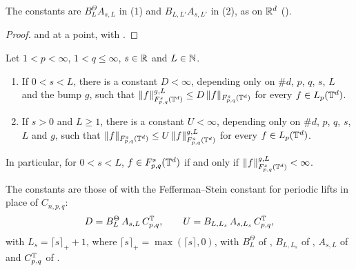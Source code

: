 The constants are $B^\Theta_L A_{s,L}$ in (1) and $B_{L,L'} A_{s,L'}$ in (2), as on $\mathbb{R}^d$
().

\begin{proof}
\leanok
{} and  at a point,
with .
\end{proof}

\begin{theorem}
\label{thm:torus-tl-local-means}
\leanok
{}
Let $1 < p < \infty$, $1 < q \leq \infty$, $s \in \mathbb{R}$ and $L \in \mathbb{N}$.
\begin{enumerate}
  \item If $0 < s < L$, there is a constant $D < \infty$, depending only on $\#d$, $p$, $q$, $s$,
    $L$ and the bump $g$, such that
    $\|f\|^{g,L}_{F^s_{p,q}(\mathbb{T}^d)} \leq D \, \|f\|_{F^s_{p,q}(\mathbb{T}^d)}$ for every
    $f \in L_p(\mathbb{T}^d)$.
  \item If $s > 0$ and $L \geq 1$, there is a constant $U < \infty$, depending only on $\#d$, $p$,
    $q$, $s$, $L$ and $g$, such that
    $\|f\|_{F^s_{p,q}(\mathbb{T}^d)} \leq U \, \|f\|^{g,L}_{F^s_{p,q}(\mathbb{T}^d)}$ for every
    $f \in L_p(\mathbb{T}^d)$.
\end{enumerate}
In particular, for $0 < s < L$, $f \in F^{s}_{p,q}(\mathbb{T}^d)$ if and only if
$\|f\|^{g,L}_{F^s_{p,q}(\mathbb{T}^d)} < \infty$.
\end{theorem}

The constants are those of  with the Fefferman--Stein constant for
periodic lifts in place of $C_{n,p,q}$:
\[
  D = B^\Theta_L \, A_{s,L} \, C^{\mathbb{T}}_{p,q}, \qquad U = B_{L,L_s} \, A_{s,L_s} \, C^{\mathbb{T}}_{p,q},
\]
with $L_s = \lceil s \rceil_+ + 1$, where $\lceil s \rceil_+ = \max(\lceil s \rceil, 0)$, with
$B^\Theta_L$ of , $B_{L,L_s}$ of
, $A_{s,L}$ of  and
$C^{\mathbb{T}}_{p,q}$ of .

